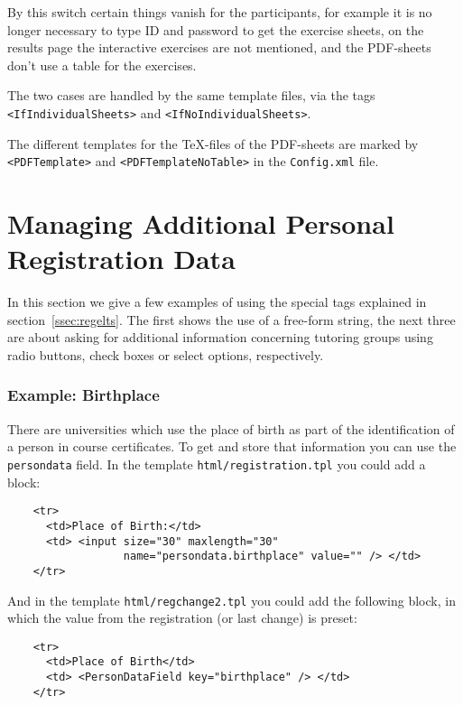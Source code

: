 \documentclass[12pt,openany,a4paper]{book}
\begin{document}
By this switch certain things vanish for the participants, for example
it is no longer necessary to type ID and password to get the exercise
sheets, on the results page the interactive exercises are not mentioned,
and the PDF-sheets don't use a table for the exercises. 

The two cases are handled by the same template files, via the tags
\texttt{<IfIndividualSheets>} and \texttt{<IfNoIndividualSheets>}.

The different templates for the \TeX-files of the PDF-sheets are marked by
\texttt{<PDFTemplate>} and \texttt{<PDFTemplateNoTable>} in the 
\texttt{Config.xml} file.

\section{Managing Additional Personal Registration Data}

In this section we give a few examples of using the special tags explained
in section~\ref{ssec:regelts}. The first shows the use of a free-form
string, the next three are about asking for additional information
concerning tutoring groups using radio buttons, check boxes or select
options, respectively.

\subsubsection*{Example: Birthplace}

There are universities which use the place of birth as part of the
identification of a person in course certificates. To get and store that
information you can use the \texttt{persondata} field. In the template 
\texttt{html/registration.tpl} you could add a block:

\begin{verbatim}
    <tr>
      <td>Place of Birth:</td>
      <td> <input size="30" maxlength="30" 
                  name="persondata.birthplace" value="" /> </td>
    </tr>
\end{verbatim}

And in the template \texttt{html/regchange2.tpl} you could add the following
block, in which the value from the registration (or last change) is preset:

\begin{verbatim}
    <tr>
      <td>Place of Birth</td>
      <td> <PersonDataField key="birthplace" /> </td>
    </tr>
\end{verbatim}
\end{document}
